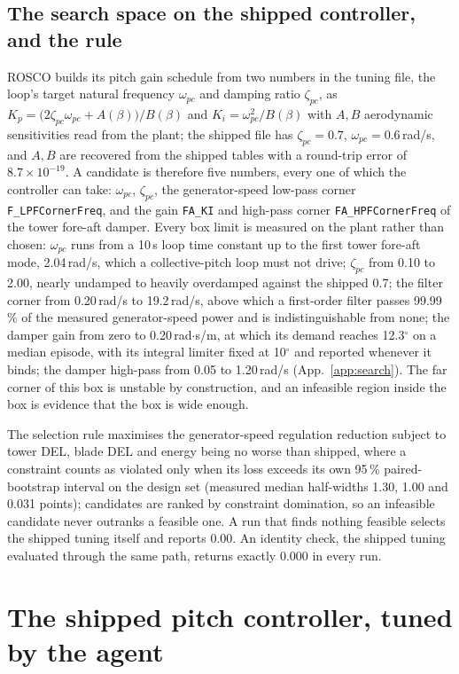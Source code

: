 \documentclass{article}
\begin{document}
\subsection{The search space on the shipped controller, and the rule}
\label{sec:space}
ROSCO builds its pitch gain schedule from two numbers in the tuning file, the loop's target natural frequency $\omega_{pc}$ and damping ratio $\zeta_{pc}$, as $K_p=\big(2\zeta_{pc}\omega_{pc}+A(\beta)\big)/B(\beta)$ and $K_i=\omega_{pc}^2/B(\beta)$ with $A,B$ aerodynamic sensitivities read from the plant; the shipped file has $\zeta_{pc}=0.7$, $\omega_{pc}=0.6$\,rad/s, and $A,B$ are recovered from the shipped tables with a round-trip error of $8.7\times10^{-19}$. A candidate is therefore five numbers, every one of which the controller can take: $\omega_{pc}$, $\zeta_{pc}$, the generator-speed low-pass corner \texttt{F\_LPFCornerFreq}, and the gain \texttt{FA\_KI} and high-pass corner \texttt{FA\_HPFCornerFreq} of the tower fore-aft damper. Every box limit is measured on the plant rather than chosen: $\omega_{pc}$ runs from a 10\,s loop time constant up to the first tower fore-aft mode, 2.04\,rad/s, which a collective-pitch loop must not drive; $\zeta_{pc}$ from 0.10 to 2.00, nearly undamped to heavily overdamped against the shipped 0.7; the filter corner from 0.20\,rad/s to 19.2\,rad/s, above which a first-order filter passes 99.99\,\% of the measured generator-speed power and is indistinguishable from none; the damper gain from zero to 0.20\,rad$\cdot$s/m, at which its demand reaches 12.3$^\circ$ on a median episode, with its integral limiter fixed at 10$^\circ$ and reported whenever it binds; the damper high-pass from 0.05 to 1.20\,rad/s (App.~\ref{app:search}). The far corner of this box is unstable by construction, and an infeasible region inside the box is evidence that the box is wide enough.

The selection rule maximises the generator-speed regulation reduction subject to tower DEL, blade DEL and energy being no worse than shipped, where a constraint counts as violated only when its loss exceeds its own 95\,\% paired-bootstrap interval on the design set (measured median half-widths 1.30, 1.00 and 0.031 points); candidates are ranked by constraint domination, so an infeasible candidate never outranks a feasible one. A run that finds nothing feasible selects the shipped tuning itself and reports 0.00. An identity check, the shipped tuning evaluated through the same path, returns exactly 0.000 in every run.

\section{The shipped pitch controller, tuned by the agent}
\label{sec:leg1}
\end{document}

